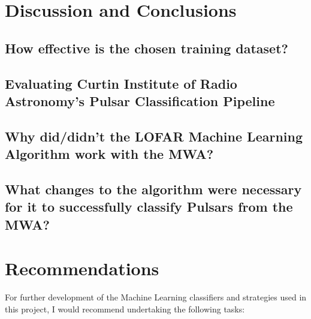 \documentclass{article}
\begin{document}
\pagebreak
\section{Discussion and Conclusions}
\subsection{How effective is the chosen training dataset?}
\subsection{Evaluating Curtin Institute of Radio Astronomy's Pulsar Classification Pipeline}
\subsection{Why did/didn't the LOFAR Machine Learning Algorithm work with the MWA?}
\subsection{What changes to the algorithm were necessary for it to successfully classify Pulsars from the MWA?}

\pagebreak
\section{Recommendations}

For further development of the Machine Learning classifiers and strategies used in this project, I would recommend undertaking the following tasks:
\end{document}
